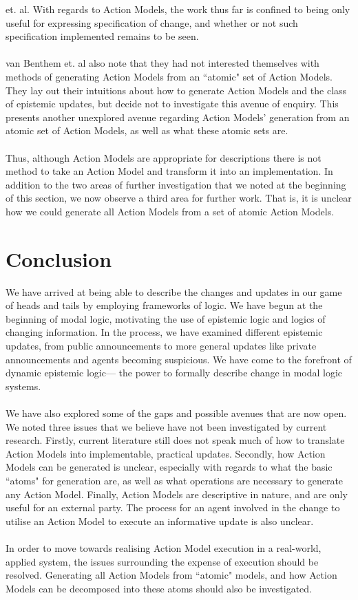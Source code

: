 \documentclass[12pt, a4paper, titlepage]{scrartcl}
\begin{document}
et. al.
With regards to Action Models, the work thus far is confined to being only
useful for expressing specification of change, and whether or not such
specification implemented remains to be seen.\\
\\
van Benthem et. al also note that they had not interested themselves with methods of
generating Action Models from an ``atomic" set of Action Models. \citep{benthem2006lcc}
They lay out their intuitions about how to generate Action Models and the class
of epistemic updates, but decide not to investigate this avenue of enquiry.
This presents another unexplored avenue regarding Action Models' generation from
an atomic set of Action Models, as well as what these atomic sets are.\\
\\
Thus, although Action Models are appropriate for descriptions there is not
method to take an Action Model and transform it into an implementation.
In addition to the two areas of further investigation that we noted at the
beginning of this section, we now observe a third area for further work.
That is, it is unclear how we could generate all Action Models from a
set of atomic Action Models.

\section{Conclusion} \label{conc}
We have arrived at being able to describe the changes and updates in our game of
heads and tails by employing frameworks of logic.
We have begun at the beginning of modal logic, motivating the use of epistemic
logic and logics of changing information.
In the process, we have examined different epistemic updates, from public
announcements to more general updates like private announcements and agents
becoming suspicious.
We have come to the forefront of dynamic epistemic logic--- the
power to formally describe change in modal logic systems.\\
\\
We have also explored some of the gaps and possible avenues that are now open.
We noted three issues that we believe have not been investigated by current
research.
Firstly, current literature still does not speak much of how to translate Action Models
into implementable, practical updates.
Secondly, how Action Models can be generated is unclear, especially with regards to what
the basic ``atoms" for generation are, as well as what operations are necessary
to generate any Action Model.
Finally, Action Models are descriptive in nature, and are only useful for an
external party.
The process for an agent involved in the change to utilise an Action Model to
execute an informative update is also unclear.\\
\\
In order to move towards realising Action Model execution in a real-world,
applied system, the issues surrounding the expense of execution should be resolved.
Generating all Action Models from ``atomic" models, and how Action Models can be
decomposed into these atoms should also be investigated.



\end{document}
